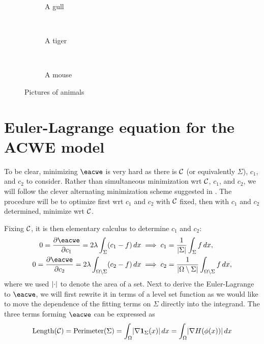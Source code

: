 \begin{figure}
	\centering
	\begin{subfigure}[b]{0.31\textwidth}
		\caption{A gull}
		\label{fig:gull}
	\end{subfigure}
	~ %
	\begin{subfigure}[b]{0.31\textwidth}
		\caption{A tiger}
		\label{fig:tiger}
	\end{subfigure}
	~ %
	\begin{subfigure}[b]{0.31\textwidth}
		\caption{A mouse}
		\label{fig:mouse}
	\end{subfigure}
	\caption{Pictures of animals}\label{fig:fitting}
\end{figure}


\section{Euler-Lagrange equation for the ACWE model}
To be clear, minimizing $\eacwe$ is very hard as there is $\mathcal{C}$ (or equivalently $\Sigma$), $c_1$, and $c_2$ to consider. Rather than simultaneous minimization wrt $\mathcal{C}$, $c_1$, and $c_2$, we will follow the clever alternating minimization scheme suggested in \cite{chan2001active}. The procedure will be to optimize first wrt $c_1$ and $c_2$ with $\mathcal{C}$ fixed, then with $c_1$ and $c_2$ determined, minimize wrt $\mathcal{C}$.

Fixing $\mathcal{C}$, it is then elementary calculus to determine $c_1$ and $c_2$: 
\begin{align*}
0 = \pd{\eacwe}{c_1}  = 2\lambda \int_{\Sigma} (c_1 - f ) \,dx
&\implies 
c_1 = \frac{1}{\abs{\Sigma}} \int_{\Sigma} f \,dx,
\\
0 = \pd{\eacwe}{c_2}  = 2\lambda \int_{\Omega\setminus \Sigma} (c_2 - f )\,dx
&\implies 
c_2 = \frac{1}{\abs{\Omega\setminus\Sigma}} \int_{\Omega\setminus \Sigma} f \,dx,
\end{align*}
where we used $\lvert\cdot\rvert$ to denote the area of a set. Next to derive the Euler-Lagrange to $\eacwe$, we will first rewrite it in terms of a level set function as we would like to move the dependence of the fitting terms on $\Sigma$ directly into the integrand. The three terms forming $\eacwe$ can be expressed as 
\begin{align*}
\textrm{Length}(\mathcal{C}) 
= \textrm{Perimeter}(\Sigma) 
= \int_{\Omega} \lvert\nabla \mathbf{1}_\Sigma(x)\rvert \,dx
= \int_{\Omega} \lvert \nabla H(\phi(x)) \rvert \,dx
\end{align*}










